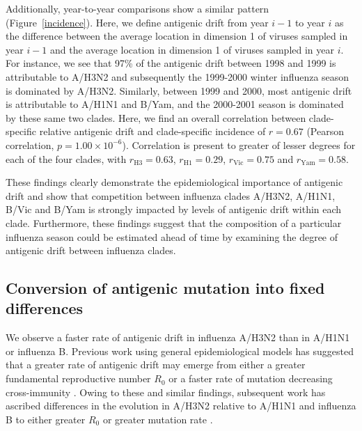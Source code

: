 \documentclass[11pt,oneside,letterpaper]{article}
\begin{document}
Additionally, year-to-year comparisons show a similar pattern (Figure~\ref{incidence}). 
Here, we define antigenic drift from year $i-1$ to year $i$ as the difference between the average location in dimension 1 of viruses sampled in year $i-1$ and the average location in dimension 1 of viruses sampled in year $i$.
For instance, we see that 97\% of the antigenic drift between 1998 and 1999 is attributable to A/H3N2 and subsequently the 1999-2000 winter influenza season is dominated by A/H3N2.
Similarly, between 1999 and 2000, most antigenic drift is attributable to A/H1N1 and B/Yam, and the 2000-2001 season is dominated by these same two clades.
Here, we find an overall correlation between clade-specific relative antigenic drift and clade-specific incidence of $r = 0.67$ (Pearson correlation, $p = 1.00 \times 10^{-6}$).
Correlation is present to greater of lesser degrees for each of the four clades, with $r_\mathrm{H3} = 0.63$, $r_\mathrm{H1} = 0.29$, $r_\mathrm{Vic} = 0.75$ and $r_\mathrm{Yam} = 0.58$.

These findings clearly demonstrate the epidemiological importance of antigenic drift and show that competition between influenza clades A/H3N2, A/H1N1, B/Vic and B/Yam is strongly impacted by levels of antigenic drift within each clade.
Furthermore, these findings suggest that the composition of a particular influenza season could be estimated ahead of time by examining the degree of antigenic drift between influenza clades.

\subsection*{Conversion of antigenic mutation into fixed differences}

We observe a faster rate of antigenic drift in influenza A/H3N2 than in A/H1N1 or influenza B.
Previous work using general epidemiological models has suggested that a greater rate of antigenic drift may emerge from either a greater fundamental reproductive number $R_0$ or a faster rate of mutation decreasing cross-immunity \cite{Gog02,Lin03}.
Owing to these and similar findings, subsequent work has ascribed differences in the evolution in A/H3N2 relative to A/H1N1 and influenza B to either greater $R_0$ or greater mutation rate \cite{Ferguson03,Bedford12}.
\end{document}
